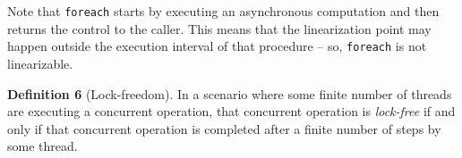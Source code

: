 \documentclass[runningheads,a4paper]{llncs}
\begin{document}
Note that \verb=foreach= starts by executing an asynchronous
computation and then returns the control to the caller. This means
that the linearization point may happen outside the execution interval
of that procedure -- so, \verb=foreach= is not linearizable.







\textbf{Definition 6} (Lock-freedom). In a scenario where some finite number
of threads are executing a concurrent operation, that concurrent operation is
\textit{lock-free} if and only if that concurrent operation is completed after
a finite number of steps by some thread.
\end{document}
